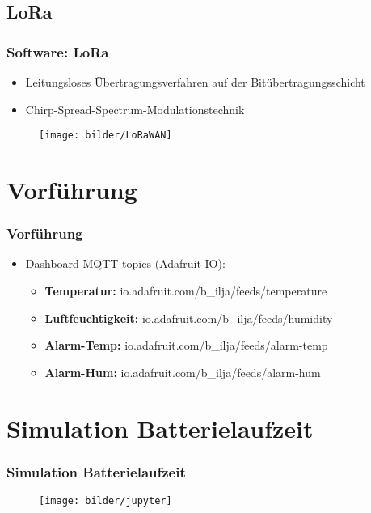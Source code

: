 \documentclass[12pt,utf8]{beamer}
\begin{document}
\subsection{LoRa}
\begin{frame}
\frametitle{Software: LoRa}
\begin{itemize}
\item Leitungsloses Übertragungsverfahren auf der Bitübertragungsschicht
\item Chirp-Spread-Spectrum-Modulationstechnik

\end{itemize}
\begin{figure}
 \texttt{[image: bilder/LoRaWAN]}
\end{figure}
\end{frame}

\section{Vorführung}
\begin{frame}
\frametitle{Vorführung}
\begin{itemize}
\item Dashboard MQTT topics (Adafruit IO):
\begin{itemize}
 \item \textbf{Temperatur:} io.adafruit.com/b\_ilja/feeds/temperature
 \item \textbf{Luftfeuchtigkeit:} io.adafruit.com/b\_ilja/feeds/humidity
 \item \textbf{Alarm-Temp:} io.adafruit.com/b\_ilja/feeds/alarm-temp
 \item \textbf{Alarm-Hum:} io.adafruit.com/b\_ilja/feeds/alarm-hum
\end{itemize}
\end{itemize}
\end{frame}

\section{Simulation Batterielaufzeit}
\begin{frame}
\frametitle{Simulation Batterielaufzeit}
\begin{figure}
 \texttt{[image: bilder/jupyter]}
\end{figure}
\end{frame}
\end{document}
